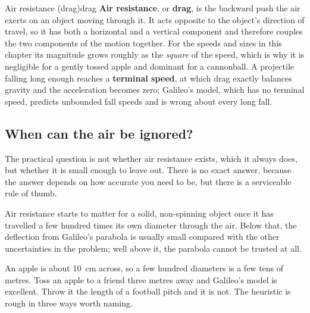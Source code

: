 \documentclass[11pt,twoside,openany]{book}
\begin{document}
\begin{definition}{Air resistance (drag)}{drag}
\textbf{Air resistance}, or \textbf{drag}, is the backward push the air exerts on an object moving through it. It acts opposite to the object's direction of travel, so it has both a horizontal and a vertical component and therefore couples the two components of the motion together. For the speeds and sizes in this chapter its magnitude grows roughly as the \emph{square} of the speed, which is why it is negligible for a gently tossed apple and dominant for a cannonball. A projectile falling long enough reaches a \textbf{terminal speed}, at which drag exactly balances gravity and the acceleration becomes zero; Galileo's model, which has no terminal speed, predicts unbounded fall speeds and is wrong about every long fall.
\end{definition}

\subsection{When can the air be ignored?}

The practical question is not whether air resistance exists, which it always does, but whether it is small enough to leave out. There is no exact answer, because the answer depends on how accurate you need to be, but there is a serviceable rule of thumb.

\begin{keyidea}
Air resistance starts to matter for a solid, non-spinning object once it has travelled a few hundred times its own diameter through the air. Below that, the deflection from Galileo's parabola is usually small compared with the other uncertainties in the problem; well above it, the parabola cannot be trusted at all.
\end{keyidea}

An apple is about \SI{10}{\centi\metre} across, so a few hundred diameters is a few tens of metres. Toss an apple to a friend three metres away and Galileo's model is excellent. Throw it the length of a football pitch and it is not. The heuristic is rough in three ways worth naming.
\end{document}

